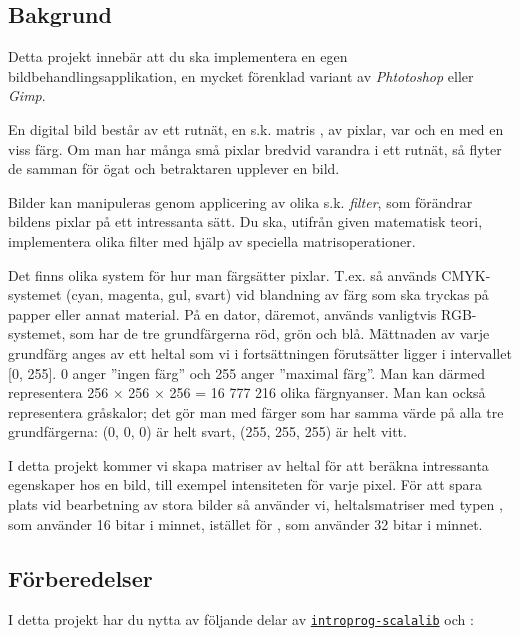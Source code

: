 

\subsection{Bakgrund}
Detta projekt innebär att du ska implementera en egen bildbehandlingsapplikation, en mycket förenklad variant av \emph{Phtotoshop} eller \emph{Gimp}. 

En digital bild består av ett rutnät, en s.k. matris , av pixlar, var och en med en viss färg. Om man har många små pixlar bredvid varandra i ett rutnät, så flyter de samman för ögat och betraktaren upplever en bild.

Bilder kan manipuleras genom applicering av olika s.k. \emph{filter}, som förändrar bildens pixlar på ett intressanta sätt. Du ska, utifrån given matematisk teori, implementera olika filter med hjälp av speciella matrisoperationer.


Det finns olika system för hur man färgsätter pixlar. T.ex. så används CMYK-systemet (cyan, magenta, gul, svart) vid blandning av färg som ska tryckas på papper eller annat material. På en dator, däremot, används vanligtvis RGB-systemet, som har de tre grundfärgerna röd, grön och blå. Mättnaden av varje grundfärg anges av ett heltal som vi i fortsättningen förutsätter ligger i intervallet [0, 255]. 0 anger ''ingen färg'' och 255 anger ''maximal färg''. Man kan därmed representera 256 × 256 × 256 = 16 777 216 olika färgnyanser. Man kan också representera gråskalor; det gör man med färger som har samma värde på alla tre 
grundfärgerna: (0, 0, 0) är helt svart, (255, 255, 255) är helt vitt. 

I detta projekt kommer vi skapa matriser av heltal för att beräkna intressanta egenskaper hos en bild, till exempel intensiteten för varje pixel. 
För att spara plats vid bearbetning av stora bilder så använder vi, heltalsmatriser med typen , som använder 16 bitar i minnet, istället för , som använder 32 bitar i minnet. 

\subsection{Förberedelser}

I detta projekt har du nytta av följande delar av \href{https://github.com/lunduniversity/introprog-scalalib}{\texttt{introprog-scalalib}} och :

